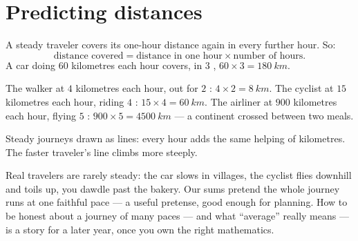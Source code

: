 \section{Predicting distances}

\begin{proposition}\label{prop:g5:speed-distance-time:distance}
A steady traveler covers its one-hour distance again in every
further hour. So:
\[
\text{distance covered} = \text{distance in one hour} \times
\text{number of hours}.
\]
A car doing $60$ kilometres each hour covers, in $3$ ,
$60 \times 3 = \qty{180}{km}$.
\end{proposition}

\begin{example}\label{ex:g5:speed-distance-time:journeys}
The walker at $4$ kilometres each hour, out for $2$ :
$4 \times 2 = \qty{8}{km}$. The cyclist at $15$ kilometres each
hour, riding $4$ : $15 \times 4 = \qty{60}{km}$. The airliner
at $900$ kilometres each hour, flying $5$ : $900 \times 5 =
\qty{4500}{km}$ --- a continent crossed between two meals.
\end{example}

\begin{omfigure}

{\small Steady journeys drawn as lines: every hour adds the same
helping of kilometres. The faster traveler's line climbs more
steeply.}
\end{omfigure}

\begin{remark}\label{rem:g5:speed-distance-time:steady}
Real travelers are rarely steady: the car slows in villages, the
cyclist flies downhill and toils up, you dawdle past the bakery.
Our sums pretend the whole journey runs at one faithful pace ---
a useful pretense, good enough for planning. How to be honest
about a journey of many paces --- and what ``average'' really
means --- is a story for a later year, once you own the right
mathematics.
\end{remark}

